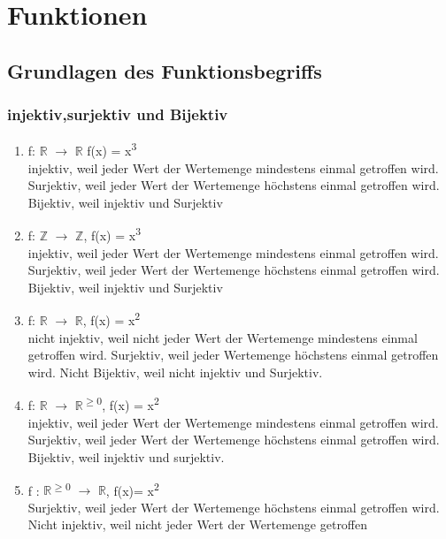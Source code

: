 \chapter{Funktionen}
\section{Grundlagen des Funktionsbegriffs}
\subsection{injektiv,surjektiv und Bijektiv}
\begin{enumerate}
    \item f: $\mathbb{R}$ $\to$ $\mathbb{R}$ f(x) = x\textsuperscript{3}\\
    {
        \tiny
        injektiv, weil jeder Wert der Wertemenge mindestens einmal
        getroffen wird. Surjektiv, weil jeder Wert der Wertemenge
        höchstens einmal getroffen wird. Bijektiv, weil injektiv
        und Surjektiv
    }
    \item f: $\mathbb{Z}$ $\to$ $\mathbb{Z}$, f(x) = x\textsuperscript{3}\\
    {
        \tiny
        injektiv, weil jeder Wert der Wertemenge mindestens einmal
        getroffen wird. Surjektiv, weil jeder Wert der Wertemenge
        höchstens einmal getroffen wird. Bijektiv, weil injektiv
        und Surjektiv
    }
    \item f: $\mathbb{R}$ $\to$ $\mathbb{R}$, f(x) = x\textsuperscript{2}\\
    {
        \tiny
        nicht injektiv, weil nicht jeder Wert der Wertemenge mindestens
        einmal getroffen wird. Surjektiv, weil jeder Wertemenge höchstens
        einmal getroffen wird. Nicht Bijektiv, weil nicht injektiv und
        Surjektiv.
    }
    \item f: $\mathbb{R}$ $\to$ $\mathbb{R}$\textsuperscript{$\geq$0}, 
    f(x) = x\textsuperscript{2}\\
    {
        \tiny
        injektiv, weil jeder Wert der Wertemenge mindestens einmal getroffen
        wird. Surjektiv, weil jeder Wert der Wertemenge höchstens einmal
        getroffen wird. Bijektiv, weil injektiv und surjektiv.
    }
    \item f : $\mathbb{R}$\textsuperscript{$\geq$0} $\to$ $\mathbb{R}$, 
    f(x)= x\textsuperscript{2}\\
    {
        \tiny
        Surjektiv, weil jeder Wert der Wertemenge höchstens einmal getroffen
        wird. Nicht injektiv, weil nicht jeder Wert der Wertemenge getroffen
}
\end{enumerate}
